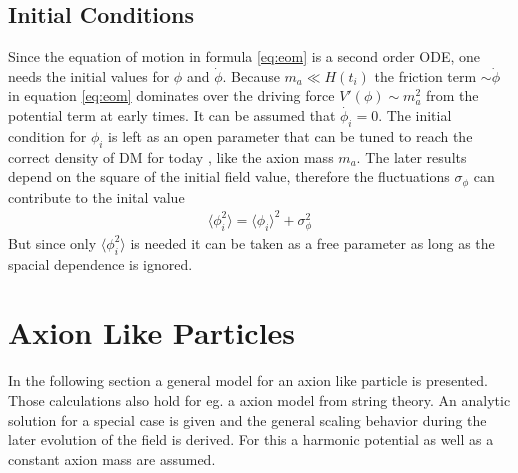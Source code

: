 \documentclass[a4paper, 12pt]{article}
\begin{document}

\subsection{Initial Conditions}
\label{sec:initial_conditions}
Since the equation of motion in formula \ref{eq:eom} is a second order ODE, one needs the initial values
for $\phi$ and $\dot{\phi}$.
Because $m_a \ll H(t_i)$ the friction term $\sim \dot{\phi}$ in equation \ref{eq:eom} dominates over the
driving force $V'(\phi) \sim m_a^2$ from the potential term at early times.
It can be assumed that $\dot{\phi_i} = 0$.
The initial condition for $\phi_i$ is left as an open parameter that can be tuned to
reach the correct density of DM for today \cite[Chap. 4.2, Page 26]{MarshAxionCosmo},
like the axion mass $m_a$.
The later results depend on the square of the initial field value, therefore the fluctuations $\sigma_\phi$ can contribute to the
inital value
\begin{align}
    \langle \phi_i^2 \rangle = \langle \phi_i \rangle ^ 2 + \sigma_\phi ^ 2
\end{align}
But since only $\langle \phi^2_i \rangle$ is needed
it can be taken as a free parameter as long as the spacial  dependence is ignored.

\section{Axion Like Particles}
In the following section a general model for an axion like particle is presented. Those calculations also hold
for eg. a axion model from string theory.
An analytic solution for a special case is given and the general scaling behavior during the later evolution of the field is derived.
For this a harmonic potential as well as a constant axion mass are assumed.
\end{document}
